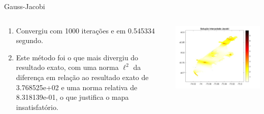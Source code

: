 \documentclass{beamer} %
\theoremstyle{definition}
\begin{document}
    \begin{frame}{Gauss-Jacobi}
        \pause
        \begin{columns}
            \begin{column}{0.5\textwidth}
               \begin{enumerate}
                   \item Convergiu com 1000 iterações e em 0.545334 segundo.
                    \pause
                    \item Este método foi o que mais divergiu do resultado exato, com uma norma $\ell^2$ da diferença em relação ao resultado exato de 3.768525e+02 e uma norma relativa de 8.318139e-01, o que justifica o mapa insatisfatório.
               \end{enumerate} 
            \end{column}
            \begin{column}{0.5\textwidth}
                \pause
                \centering
                \includegraphics[width=\textwidth]{GJinterpol.jpeg}
            \end{column}
        \end{columns}
    \end{frame}
\end{document}
